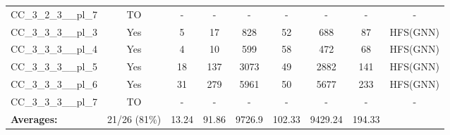 \documentclass{article}
\begin{document}
\begin{tabular}{lcccccccc}
CC\_3\_2\_3\_\_pl\_7 & TO & - & - & - & - & - & - & - \\
CC\_3\_3\_3\_\_pl\_3 & Yes & 5 & 17 & 828 & 52 & 688 & 87 & HFS(GNN) \\
CC\_3\_3\_3\_\_pl\_4 & Yes & 4 & 10 & 599 & 58 & 472 & 68 & HFS(GNN) \\
CC\_3\_3\_3\_\_pl\_5 & Yes & 18 & 137 & 3073 & 49 & 2882 & 141 & HFS(GNN) \\
CC\_3\_3\_3\_\_pl\_6 & Yes & 31 & 279 & 5961 & 50 & 5677 & 233 & HFS(GNN) \\
CC\_3\_3\_3\_\_pl\_7 & TO & - & - & - & - & - & - & - \\
\textbf{Averages:} & 21/26 (81\%) & 13.24 & 91.86 & 9726.9 & 102.33 & 9429.24 & 194.33 & \\
\bottomrule
\end{tabular}
\\[0.7cm]
\end{document}
